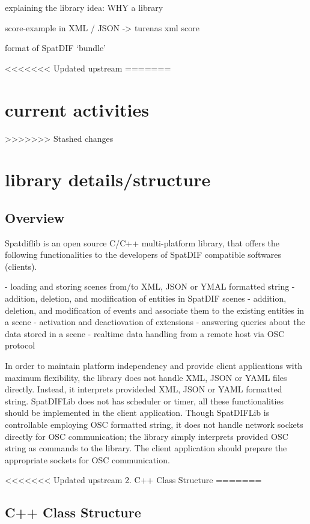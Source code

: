 \documentclass{article}
\begin{document}
explaining the library idea: WHY a library

score-example in XML / JSON -> turenas xml score

format of SpatDIF `bundle'

<<<<<<< Updated upstream
=======
\section{current activities} %


>>>>>>> Stashed changes
\section{library details/structure} %

\subsection{Overview}

Spatdiflib is an open source C/C++ multi-platform library, that offers the following functionalities to the developers of SpatDIF compatible softwares (clients).

- loading and storing scenes from/to XML, JSON or YMAL formatted string
- addition, deletion, and modification of entities in SpatDIF scenes
- addition, deletion, and modification of events and associate them to the existing entities in a scene
- activation and deactiovation of extensions
- answering queries about the data stored in a scene
- realtime data handling from a remote host via OSC protocol

In order to maintain platform independency and provide client applications with maximum flexibility, the library does not handle XML, JSON or YAML files directly. Instead, it interprets provideded XML, JSON or YAML formatted string.  SpatDIFLib does not has scheduler or timer, all these functionalities should be implemented in the client application. Though SpatDIFLib is controllable employing OSC formatted string, it does not handle network sockets directly for OSC communication; the library simply interprets provided OSC string as commands to the library.  The client application should prepare the appropriate sockets for OSC communication.

<<<<<<< Updated upstream
2. C++ Class Structure
=======

\subsection{C++ Class Structure}
\end{document}
